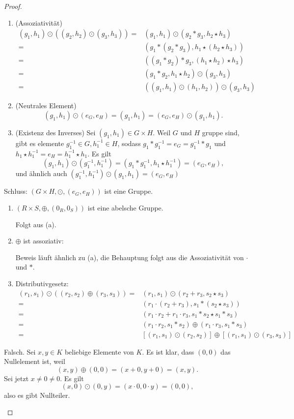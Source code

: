 \begin{proof}
	\begin{parts}
	\item 
		\begin{enumerate}[label=(\roman*)]
			\item (Assoziativität) 
\begin{align*}
	(g_1,h_1)\odot ((g_2,h_2)\odot(g_3,h_3))=&(g_1,h_1)\odot(g_2*g_3,h_2\star h_3)\\
	=& (g_1*(g_2*g_3), h_1\star(h_2\star h_3))\\
	=& ((g_1*g_2)*g_3,(h_1\star h_2)\star h_3)\\ 
	=& (g_1*g_2,h_1\star h_2)\odot (g_3,h_3)\\
	=& ((g_1,h_1)\odot (h_1,h_2))\odot (g_3,h_3)
\end{align*}
\item (Neutrales Element)
	\[
		(g_1,h_1)\odot (e_G,e_H)=(g_1,h_1)=(e_G,e_H)\odot (g_1,h_1)
	.\] 
\item (Existenz des Inverses) Sei $(g_1,h_1)\in G\times H$. Weil $G$ und $H$ gruppe sind, gibt es elemente $g_1^{-1}\in G, h_1^{-1}\in H$, sodass $g_1*g_1^{-1}=e_G=g_1^{-1}*g_1$ und $h_1\star h_1^{-1}=e_H=h_1^{-1}\star h_1$. Es gilt
	\[
		(g_1,h_1)\odot(g_1^{-1},h_1^{-1})=(g_1*g_1^{-1},h_1\star h_1^{-1})=(e_G,e_H)
	,\]
	und ähnlich auch $(g_1^{-1},h_1^{-1})\odot (g_1,h_1)=(e_G,e_H)$
		\end{enumerate}
		Schluss: $ (G\times H, \odot, (e_G,e_H))$ ist eine Gruppe.
	\item 
		\begin{enumerate}[label=(\roman*)]
			\item $(R\times S,\oplus, (0_R, 0_S))$ ist eine abelsche Gruppe.

				Folgt aus (a).
\item $\oplus$ ist assoziativ:

	Beweis läuft ähnlich zu (a), die Behauptung folgt aus die Assoziativität von $\cdot$ und $*$.
\item Distributivgesetz:
	 \begin{align*}
		 (r_1,s_1)\odot\left( (r_2,s_2)\oplus(r_3,s_3) \right) =& (r_1,s_1)\odot(r_2+r_3,s_2\star s_3)\\
		 =&(r_1\cdot (r_2+r_3),s_1*(s_2\star s_3))\\
		 =&(r_1\cdot r_2+r_1\cdot r_3, s_1*s_2\star s_1*s_3)\\
		 =&(r_1\cdot r_2, s_1*s_2)\oplus (r_1\cdot r_3, s_1*s_3)\\
		 =&\left[(r_1,s_1)\odot(r_2,s_2)\right]\oplus \left[ (r_1,s_1)\odot (r_3,s_3) \right] 
	\end{align*}
		\end{enumerate}
	\item Falsch. Sei $x,y\in K$ beliebige Elemente von $K$. Es ist klar, dass $(0,0)$ das Nullelement ist, weil
		\[
			(x,y)\oplus(0,0)=(x+0,y+0)=(x,y)
		.\] 
		Sei jetzt $x\neq 0 \neq 0$. Es gilt
		\[
			(x,0)\odot (0,y)=(x\cdot 0, 0 \cdot y)=(0,0)
		,\] 
		also es gibt Nullteiler.\qedhere
	\end{parts}
\end{proof}
